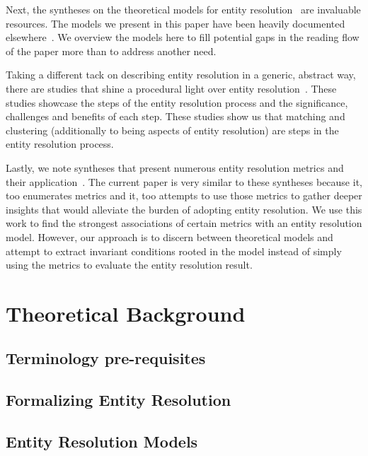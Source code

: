 \documentclass[journal]{IEEEtran}
\begin{document}
    Next, the syntheses on the theoretical models for entity
    resolution~\cite{fs1969,Ben2009Swoosh,Tal11} are invaluable resources.
    The models we present in this paper have been heavily documented
    elsewhere~\cite{Tal11,tal2013}.    
    We overview the models here to fill potential gaps in the reading flow of
    the paper more than to address another need.
    
    Taking a different tack on describing entity resolution in a generic,
    abstract way, there are studies that shine a procedural light over entity
    resolution~\cite{Pap19,Chen09}.
    These studies showcase the steps of the entity resolution process and the
    significance, challenges and benefits of each step.
    These studies show us that matching and clustering (additionally to being
    aspects of entity resolution) are steps in the entity resolution process.

    Lastly, we note syntheses that present numerous entity resolution metrics
    and their application~\cite{hitesh2012,graf2021frost,barnes2015practioner}.
    The current paper is very similar to these syntheses because it, too
    enumerates metrics and it, too attempts to use those metrics to gather
    deeper insights that would alleviate the burden of adopting entity
    resolution.
    We use this work to find the strongest associations of certain metrics with
    an entity resolution model.
    However, our approach is to discern between theoretical models and attempt
    to extract invariant conditions rooted in the model instead of simply using
    the metrics to evaluate the entity resolution result.

    \section{Theoretical Background}\label{sec:Theoretical Background}
    \subsection{Terminology pre-requisites}\label{sec:Terminology}
    
    
    \subsection{Formalizing Entity Resolution}\label{sec:Entity Resolution Formalization}
    

    \subsection{Entity Resolution Models}\label{subsec:Entity Resolution Models}
\end{document}
